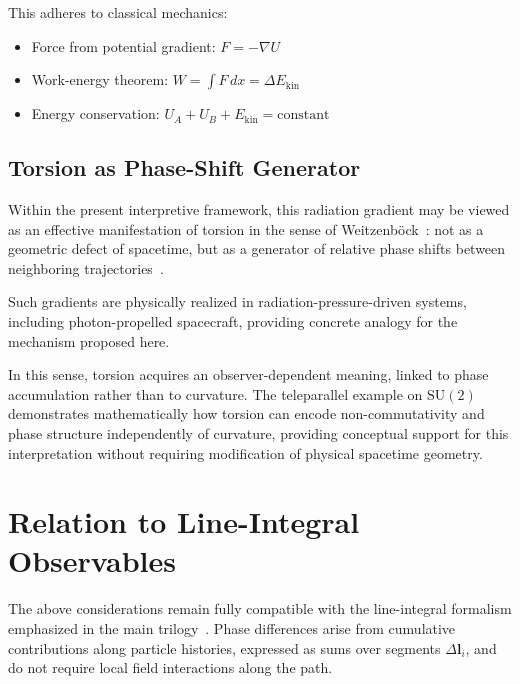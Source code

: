 \documentclass[12pt,letterpaper]{article}
\begin{document}
This adheres to classical mechanics:
\begin{itemize}
\item Force from potential gradient: $F = -\nabla U$
\item Work-energy theorem: $W = \int F \, dx = \Delta E_{\mathrm{kin}}$
\item Energy conservation: $U_A + U_B + E_{\mathrm{kin}} = \text{constant}$
\end{itemize}

\subsection{Torsion as Phase-Shift Generator}

Within the present interpretive framework, this radiation gradient may be viewed as an effective manifestation of torsion in the sense of Weitzenb\"{o}ck~\cite{Weitzenbock1923,Aldrovandi2013}: not as a geometric defect of spacetime, but as a generator of relative phase shifts between neighboring trajectories~\cite{hanamura18135855}.

Such gradients are physically realized in radiation-pressure-driven systems, including photon-propelled spacecraft, providing concrete analogy for the mechanism proposed here.

In this sense, torsion acquires an observer-dependent meaning, linked to phase accumulation rather than to curvature. The teleparallel example on $\mathrm{SU}(2)$~\cite{Aldrovandi2013} demonstrates mathematically how torsion can encode non-commutativity and phase structure independently of curvature, providing conceptual support for this interpretation without requiring modification of physical spacetime geometry.


\section{Relation to Line-Integral Observables}

\justifying
The above considerations remain fully compatible with the line-integral formalism emphasized in the main trilogy~\cite{hanamura18067760,hanamura18135855,hanamura18203433}. Phase differences arise from cumulative contributions along particle histories, expressed as sums over segments $\Delta \mathbf{l}_i$, and do not require local field interactions along the path.
\end{document}
